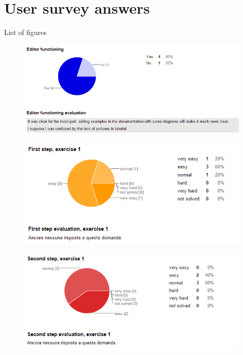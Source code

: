 \chapter{User survey answers}\label{appendixB}
List of figures
 \begin{figure}[H]
   \centering
   \includegraphics[width=\linewidth]{pictures/survey1.png}
 \end{figure}

 \begin{figure}[H]
   \centering
   \includegraphics[width=\linewidth]{pictures/survey2.png}
 \end{figure}

 \begin{figure}[H]
   \centering
   \includegraphics[width=\linewidth]{pictures/survey3.png}
 \end{figure}

